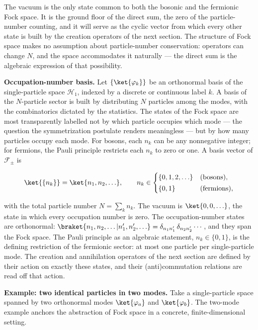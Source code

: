 The vacuum is the only state common to both the bosonic and the fermionic Fock space. It is the ground floor of the direct sum, the zero of the particle-number counting, and it will serve as the cyclic vector from which every other state is built by the creation operators of the next section. The structure of Fock space makes no assumption about particle-number conservation: operators can change $N$, and the space accommodates it naturally --- the direct sum is the algebraic expression of that possibility.

\medskip\noindent\textbf{Occupation-number basis.}
Let $\{\ket{\varphi_k}\}$ be an orthonormal basis of the single-particle space $\mathcal{H}_1$, indexed by a discrete or continuous label $k$. A basis of the $N$-particle sector is built by distributing $N$ particles among the modes, with the combinatorics dictated by the statistics. The states of the Fock space are most transparently labelled not by which particle occupies which mode --- the question the symmetrization postulate renders meaningless --- but by how many particles occupy each mode. For bosons, each $n_k$ can be any nonnegative integer; for fermions, the Pauli principle restricts each $n_k$ to zero or one. A basis vector of $\mathcal{F}_\pm$ is
\begin{linenomath}
    \begin{equation}
        \ket{\{n_k\}} = \ket{n_1, n_2, \ldots},
        \qquad
        n_k \in \begin{cases}
            \{0, 1, 2, \ldots\} & \text{(bosons)}, \\[2pt]
            \{0, 1\}            & \text{(fermions)},
        \end{cases}
        \label{eq:occupation-basis}
    \end{equation}
\end{linenomath}
with the total particle number $N = \sum_k n_k$. The vacuum is $\ket{0, 0, \ldots}$, the state in which every occupation number is zero. The occupation-number states are orthonormal: $\braket{n_1, n_2, \ldots|n_1', n_2', \ldots} = \delta_{n_1 n_1'}\,\delta_{n_2 n_2'}\cdots$, and they span the Fock space. The Pauli principle as an algebraic statement, $n_k \in \{0,1\}$, is the defining restriction of the fermionic sector: at most one particle per single-particle mode. The creation and annihilation operators of the next section are defined by their action on exactly these states, and their (anti)commutation relations are read off that action.

\medskip\noindent\textbf{Example: two identical particles in two modes.}
Take a single-particle space spanned by two orthonormal modes $\ket{\varphi_a}$ and $\ket{\varphi_b}$. The two-mode example anchors the abstraction of Fock space in a concrete, finite-dimensional setting.

